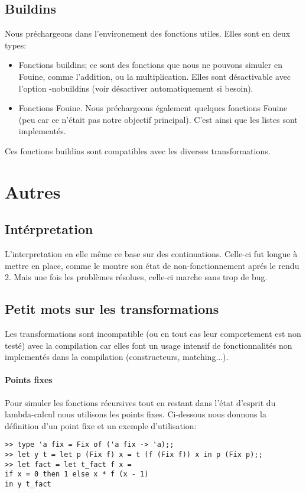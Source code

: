 \documentclass[paper=a4, fontsize=11pt, twocolumn]{article}
\begin{document}
\subsection{Buildins}
Nous préchargeons dans l'environement des fonctions utiles. Elles sont en deux types:
\begin{itemize}
	\item Fonctions buildins; ce sont des fonctions que nous ne pouvons  simuler en Fouine, comme l'addition, ou la multiplication. Elles sont désactivable avec l'option -nobuildins (voir désactiver automatiquement si besoin).
	\item Fonctions Fouine. Nous préchargeons également quelques fonctions Fouine (peu car ce n'était pas notre objectif principal). C'est ainsi que les listes sont implementés.
\end{itemize}
Ces fonctions buildins sont compatibles avec les diverses transformations.


\section{Autres}
\subsection{Intérpretation}
L'interpretation en elle même ce base sur des continuations. Celle-ci fut longue à mettre en place, comme le montre son état de non-fonctionnement aprés le rendu 2. Mais une fois les problèmes résolues, celle-ci marche sans trop de bug.
\subsection{Petit mots sur les transformations}
Les transformations sont incompatible (ou en tout cas leur comportement est non testé) avec la compilation car elles font un usage intensif de fonctionnalités non implementés dans la compilation (constructeurs, matching...).

\paragraph{Points fixes} \label{pointsfixes}
Pour simuler les fonctions récursives tout en restant dans l'état d'esprit du lambda-calcul nous utilisons les points fixes. Ci-dessous nous donnons la définition d'un point fixe et un exemple d'utilisation:

\begin{verbatim}
>> type 'a fix = Fix of ('a fix -> 'a);;
>> let y t = let p (Fix f) x = t (f (Fix f)) x in p (Fix p);;
>> let fact = let t_fact f x = 
if x = 0 then 1 else x * f (x - 1) 
in y t_fact
\end{verbatim}
\end{document}
